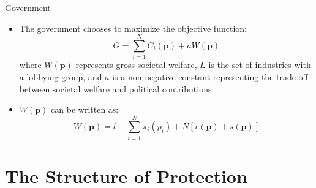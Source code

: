 \documentclass[aspectratio=169]{beamer}
\begin{document}
\begin{frame}{Government}

\begin{itemize}
    \item<1-> The government chooses to maximize the objective function:
    \begin{equation*}
        G = \sum_{i = 1}^{N} C_{i}\left( \mathbf{p} \right) + a W\left( \mathbf{p} \right)
    \end{equation*}
    where $ W\left( \mathbf{p} \right) $ represents gross societal welfare, $ L $ is the set of industries with a lobbying group, and $ a $ is a non-negative constant representing the trade-off between societal welfare and political contributions.
    \item<2-> $ W\left( \mathbf{p} \right) $ can be written as:
    \begin{equation*}
        W\left( \mathbf{p} \right) = l + \sum_{i = 1}^{N} \pi_{i}\left( p_{i} \right) + N\left[ r\left( \mathbf{p} \right) + s\left( \mathbf{p} \right) \right]
    \end{equation*}
\end{itemize}
    
\end{frame}


\section{The Structure of Protection}

\end{document}
